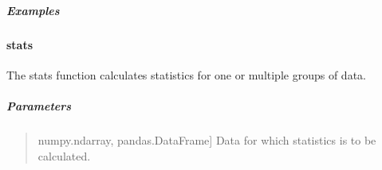 \documentclass[letterpaper,10pt,english,openany,oneside]{sphinxmanual}
\begin{document}
{{{{\begin{fulllineitems}
\begin{quote}
\begin{description}
\end{description}
\end{quote}


\subparagraph{Examples}
\label{\detokenize{api_reference/generated/QuadratiK.tools.sample_hypersphere:examples}}
\begin{sphinxVerbatim}[commandchars=\\\{\}]
   
  
\PYG{p}{[}\PYG{p}{[}     \PYG{p}{]}
       \PYG{p}{[}   \PYG{p}{]} 
\end{sphinxVerbatim}

\end{fulllineitems}




\sphinxstepscope


\paragraph{stats}
\label{\detokenize{api_reference/generated/QuadratiK.tools.stats:stats}}\label{\detokenize{api_reference/generated/QuadratiK.tools.stats::doc}}

\begin{fulllineitems}
\label{\detokenize{api_reference/generated/QuadratiK.tools.stats:QuadratiK.tools.stats}}
\pysigstartsignatures
{}
\pysigstopsignatures
\sphinxAtStartPar
The stats function calculates statistics for one or multiple groups of data.


\subparagraph{Parameters}
\label{\detokenize{api_reference/generated/QuadratiK.tools.stats:parameters}}\begin{quote}
\begin{description}
\sphinxlineitem{x}{[}numpy.ndarray, pandas.DataFrame{]}
\sphinxAtStartPar
Data for which statistics is to be calculated.


\end{description}
\end{quote}
\end{fulllineitems}}}}}
\end{document}
